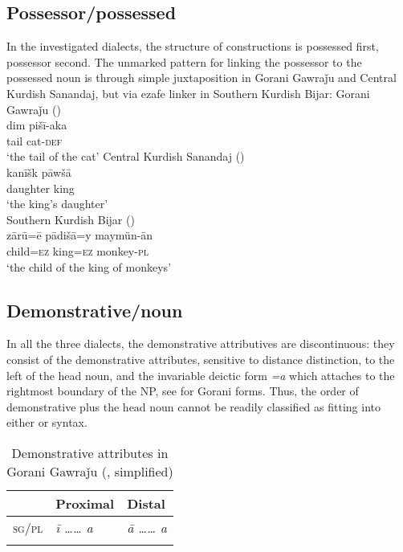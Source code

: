 \documentclass[output=paper,colorlinks,citecolor=brown]{langscibook}
\begin{document}
\begin{sloppypar}
\subsection{Possessor/possessed}
In the investigated dialects, the structure of  constructions is possessed first, possessor second. The unmarked pattern for linking the possessor to the possessed noun is through simple juxtaposition in Gorani Gawraǰu and Central Kurdish Sanandaj, but via ezafe linker in Southern Kurdish Bijar:
\ea
\ea\label{MGKC:ex:3a}
Gorani Gawraǰu (\citealt[A, 0175]{mohammadirad_gorani_2022}) \\
\gll dim pišī-aka \\
tail cat-\textsc{def} \\
\glt `the tail of the cat'
\ex\label{MGKC:ex:3b}
Central Kurdish Sanandaj (\citealt[G, 0714]{mohammadirad_Sanandaj_Kurdish_2022}) \\
\gll kanīšk pāwšā \\
daughter king \\
\glt `the king's daughter' \\
\ex\label{MGKC:ex:3c}
Southern Kurdish Bijar (\citealt[D, 0318]{mohammadirad_Bijar_Kurdish_2022}) \\
\gll zārū=ē pādišā=y maymün-ān \\
child\textsc{=ez} king\textsc{=ez} monkey\textsc{-pl} \\
\glt `the child of the king of monkeys'
\z
\z 

\subsection{Demonstrative/noun}
In all the three dialects, the demonstrative attributives are discontinuous: they consist of the demonstrative attributes, sensitive to distance distinction, to the left of the head noun, and the invariable deictic form \textit{=a} which attaches to the rightmost boundary of the NP, see  for Gorani forms. Thus, the order of demonstrative plus the head noun cannot be readily classified as fitting into either  or  syntax.

\begin{table}
    \begin{tabular}{lll}
\lsptoprule
 & \textbf{Proximal} & \textbf{Distal} \\
\midrule
\textsc{sg/pl} & \textit{ī …… a} &\textit{ā …… a}    \\
\lspbottomrule
    \end{tabular}
    \caption{Demonstrative attributes in Gorani Gawraǰu (\citealt[169]{bailey_grammar_2018}{}, simplified)}
    \label{MGK:tab:2}
\end{table}


\end{sloppypar}
\end{document}
